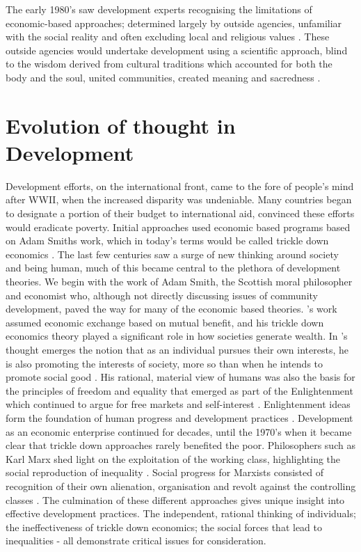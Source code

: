 The early 1980's saw development experts recognising the limitations of economic-based approaches; determined largely by outside agencies, unfamiliar with the social reality and often excluding local and religious values \citep{Goulet1980}. These outside agencies would undertake development using a scientific approach, blind to the wisdom derived from cultural traditions which accounted for both the body and the soul, united communities, created meaning and sacredness \citep{Goulet1980}. 



\section{Evolution of thought in Development}

Development efforts, on the international front, came to the fore of people's mind after WWII, when the increased disparity was undeniable. Many countries began to designate a portion of their budget to international aid, convinced these efforts would eradicate poverty. Initial approaches used economic based programs based on Adam Smiths work, which in today's terms would be called trickle down economics \citep{Morrison2009}. 
The last few centuries saw a surge of new thinking around society and being human, much of this became central to the plethora of development theories. We begin with the work of Adam Smith, the Scottish moral philosopher and economist who, although not directly discussing issues of community development, paved the way for many of the economic based theories. \citeauthor{Smith1998}'s work assumed economic exchange based on mutual benefit, and his trickle down economics theory played a significant role in how societies generate wealth. In \citeauthor{Smith1998}'s thought emerges the notion that as an individual pursues their own interests, he is also promoting the interests of society, more so than when he intends to promote social good \citeyearpar[][par. IV.2.9]{Smith1998}. His rational, material view of humans was also the basis for the principles of freedom and equality that emerged as part of the Enlightenment which continued to argue for free markets and self-interest \citep{McKernan2013}. Enlightenment ideas form the foundation of human progress and development practices \citep{Schafer2012}. Development as an economic enterprise continued for decades, until the 1970's when it became clear that trickle down approaches rarely benefited the poor. Philosophers such as Karl Marx shed light on the exploitation of the working class, highlighting the social reproduction of inequality \citep{Fukuyama2011b}. Social progress for Marxists consisted of recognition of their own alienation, organisation and revolt against the controlling classes \citep{Vakil2001}. The culmination of these different approaches gives unique insight into effective development practices. The independent, rational thinking of individuals; the ineffectiveness of trickle down economics; the social forces that lead to inequalities - all demonstrate critical issues for consideration. %
